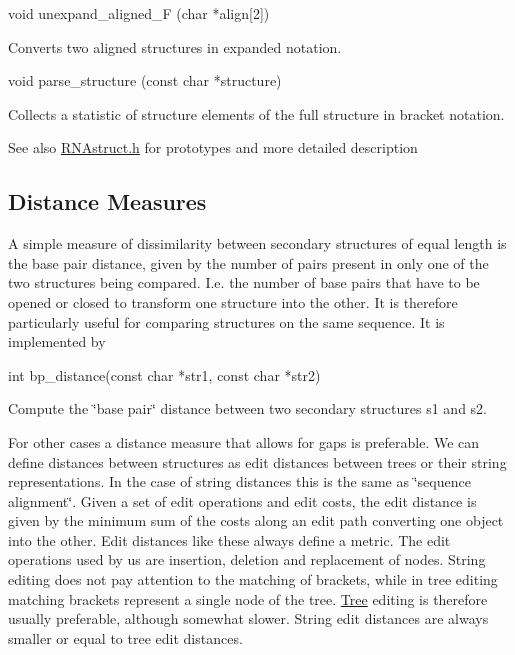 \begin{DoxyVerb}void   unexpand_aligned_F (char *align[2])
\end{DoxyVerb}
 Converts two aligned structures in expanded notation.

\begin{DoxyVerb}void   parse_structure (const char *structure)
\end{DoxyVerb}
 Collects a statistic of structure elements of the full structure in bracket notation.

\begin{DoxySeeAlso}{See also}
\hyperlink{RNAstruct_8h}{R\+N\+Astruct.\+h} for prototypes and more detailed description
\end{DoxySeeAlso}
\subsection*{Distance Measures}

A simple measure of dissimilarity between secondary structures of equal length is the base pair distance, given by the number of pairs present in only one of the two structures being compared. I.\+e. the number of base pairs that have to be opened or closed to transform one structure into the other. It is therefore particularly useful for comparing structures on the same sequence. It is implemented by

\begin{DoxyVerb}int bp_distance(const char *str1,
                const char *str2)
\end{DoxyVerb}
 Compute the \char`\"{}base pair\char`\"{} distance between two secondary structures s1 and s2.

For other cases a distance measure that allows for gaps is preferable. We can define distances between structures as edit distances between trees or their string representations. In the case of string distances this is the same as \char`\"{}sequence alignment\char`\"{}. Given a set of edit operations and edit costs, the edit distance is given by the minimum sum of the costs along an edit path converting one object into the other. Edit distances like these always define a metric. The edit operations used by us are insertion, deletion and replacement of nodes. String editing does not pay attention to the matching of brackets, while in tree editing matching brackets represent a single node of the tree. \hyperlink{structTree}{Tree} editing is therefore usually preferable, although somewhat slower. String edit distances are always smaller or equal to tree edit distances.

